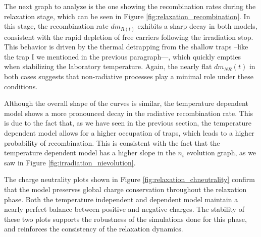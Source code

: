 \vspace{10pt}

The next graph to analyze is the one showing the recombination rates during the relaxation stage, which can be seen in Figure \ref{fig:relaxation_recombination}. In this stage, the recombination rate $dm_{R(t)}$ exhibits a sharp decay in both models, consistent with the rapid depletion of free carriers following the irradiation stop. This behavior is driven by the thermal detrapping from the shallow traps --like the trap I we mentioned in the previous paragraph---, which quickly empties when stabilizing the laboratory temperature. Again, the nearly flat $dm_{NR}(t)$ in both cases suggests that non-radiative processes play a minimal role under these conditions.

\vspace{10pt}

Although the overall shape of the curves is similar, the temperature dependent model shows a more pronounced decay in the radiative recombination rate. This is due to the fact that, as we have seen in the previous section, the temperature dependent model allows for a higher occupation of traps, which leads to a higher probability of recombination. This is consistent with the fact that the temperature dependent model has a higher slope in the $n_i$ evolution graph, as we saw in Figure \ref{fig:irradiation_nievolution}.

\vspace{10pt}

The charge neutrality plots shown in Figure \ref{fig:relaxation_chneutrality} confirm that the model preserves global charge conservation throughout the relaxation phase. Both the temperature independent and dependent model maintain a nearly perfect balance between positive and negative charges. The stability of these two plots supports the robustness of the simulations done for this phase, and reinforces the consistency of the relaxation dynamics.

